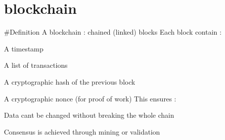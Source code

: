 \chapter{blockchain}
\hypertarget{md_blockchain}{}\label{md_blockchain}
\#\+Definition A blockchain \+: chained (linked) blocks Each block contain \+:
\begin{DoxyItemize}
\item A timestamp
\item A list of transactions
\item A cryptographic hash of the previous block
\item A cryptographic nonce (for proof of work) This ensures \+:
\item Data can\textquotesingle{}t be changed without breaking the whole chain
\item Consensus is achieved through mining or validation 
\end{DoxyItemize}